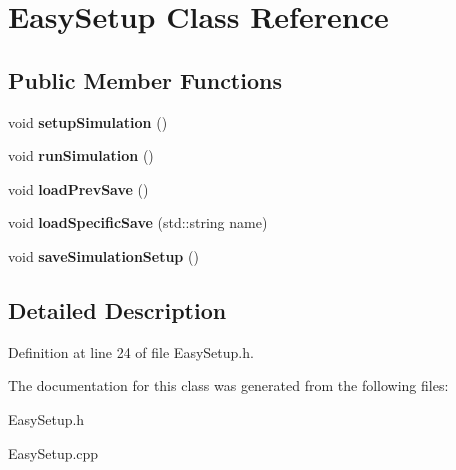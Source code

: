 \hypertarget{classEasySetup}{}\section{Easy\+Setup Class Reference}
\label{classEasySetup}
\subsection*{Public Member Functions}
\begin{DoxyCompactItemize}
\item 
\mbox{\label{classEasySetup_a981235de9d25590d4244431156ed988b}} 
void {\bfseries setup\+Simulation} ()
\item 
\mbox{\label{classEasySetup_a1ac115d19445ab58d548d432f84b5475}} 
void {\bfseries run\+Simulation} ()
\item 
\mbox{\label{classEasySetup_a4a5ca518b7815635460c6b9d05d9f472}} 
void {\bfseries load\+Prev\+Save} ()
\item 
\mbox{\label{classEasySetup_a1d0a99d9c878a774cb3b7eddf3de8ffa}} 
void {\bfseries load\+Specific\+Save} (std\+::string name)
\item 
\mbox{\label{classEasySetup_aa24cd1c17aef0bc5eb95373365c791ed}} 
void {\bfseries save\+Simulation\+Setup} ()
\end{DoxyCompactItemize}


\subsection{Detailed Description}


Definition at line 24 of file Easy\+Setup.\+h.



The documentation for this class was generated from the following files\+:\begin{DoxyCompactItemize}
\item 
Easy\+Setup.\+h\item 
Easy\+Setup.\+cpp\end{DoxyCompactItemize}

